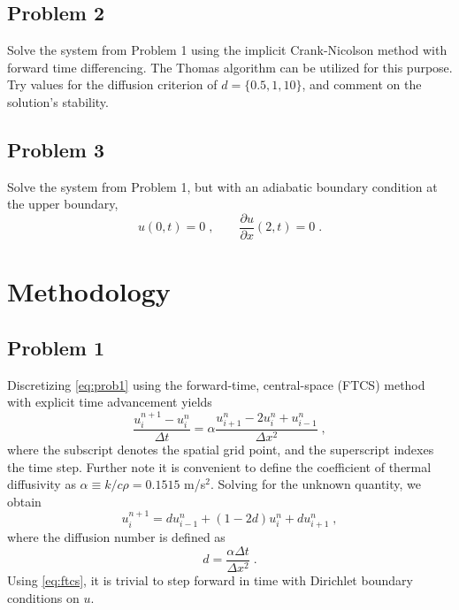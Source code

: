 \documentclass[11pt]{article}
\begin{document}
\subsection{Problem 2}

Solve the system from Problem 1 using the implicit Crank-Nicolson method with forward time differencing. The Thomas algorithm can be utilized for this purpose. Try values for the diffusion criterion of $d = \{0.5, 1, 10\}$, and comment on the solution's stability.

\subsection{Problem 3}

Solve the system from Problem 1, but with an adiabatic boundary condition at the upper boundary,
\begin{equation}
u(0,t) = 0 \;, \qquad \frac{\partial u}{\partial x}(2,t) = 0
\;.
\label{eq:prob3}
\end{equation}

\section{Methodology} %

\subsection{Problem 1}

Discretizing \eqref{eq:prob1} using the forward-time, central-space (FTCS) method with explicit time advancement yields
\begin{equation}
\frac{u_i^{n+1} - u_i^n}{\Delta t} = \alpha \frac{u_{i+1}^n - 2u_i^n + u_{i-1}^n}{\Delta x^2}
\;,
\end{equation}
where the subscript denotes the spatial grid point, and the superscript indexes the time step. Further note it is convenient to define the coefficient of thermal diffusivity as $\alpha \equiv k / c \rho = 0.1515$ m/s$^2$. Solving for the unknown quantity, we obtain
\begin{equation}
u_i^{n+1} = d u_{i-1}^n + (1-2d) u_i^n + d u_{i+1}^n
\;,
\label{eq:ftcs}
\end{equation}
where the diffusion number is defined as
\begin{equation}
d = \frac{\alpha \Delta t}{\Delta x^2}
\;.
\end{equation}
Using \eqref{eq:ftcs}, it is trivial to step forward in time with Dirichlet boundary conditions on $u$.
\end{document}
